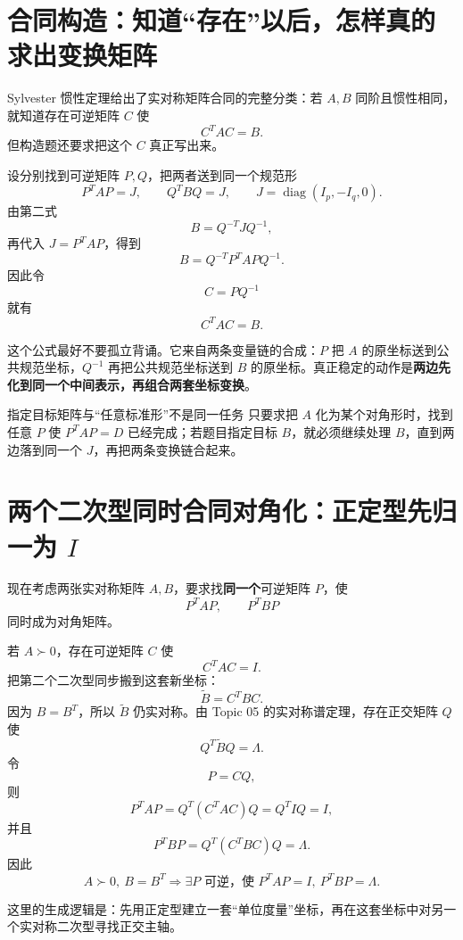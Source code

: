 \documentclass[11pt,a4paper]{ctexart}
\newcommand{\kw}[1]{\textbf{\color{deep}#1}}
\begin{document}
\section{合同构造：知道“存在”以后，怎样真的求出变换矩阵}

Sylvester 惯性定理给出了实对称矩阵合同的完整分类：若 $A,B$ 同阶且惯性相同，就知道存在可逆矩阵 $C$ 使
\[
C^TAC=B.
\]
但构造题还要求把这个 $C$ 真正写出来。

设分别找到可逆矩阵 $P,Q$，把两者送到同一个规范形
\[
P^TAP=J,
\qquad
Q^TBQ=J,
\qquad
J=\operatorname{diag}(I_p,-I_q,0).
\]
由第二式
\[
B=Q^{-T}JQ^{-1},
\]
再代入 $J=P^TAP$，得到
\[
B=Q^{-T}P^TAPQ^{-1}.
\]
因此令
\[
\boxed{C=PQ^{-1}}
\]
就有
\[
\boxed{C^TAC=B.}
\]

这个公式最好不要孤立背诵。它来自两条变量链的合成：$P$ 把 $A$ 的原坐标送到公共规范坐标，$Q^{-1}$ 再把公共规范坐标送到 $B$ 的原坐标。真正稳定的动作是\kw{两边先化到同一个中间表示，再组合两套坐标变换}。

\begin{methodbox}{指定目标矩阵与“任意标准形”不是同一任务}
只要求把 $A$ 化为某个对角形时，找到任意 $P$ 使 $P^TAP=D$ 已经完成；若题目指定目标 $B$，就必须继续处理 $B$，直到两边落到同一个 $J$，再把两条变换链合起来。
\end{methodbox}

\section{两个二次型同时合同对角化：正定型先归一为 $I$}

现在考虑两张实对称矩阵 $A,B$，要求找\kw{同一个}可逆矩阵 $P$，使
\[
P^TAP,
\qquad
P^TBP
\]
同时成为对角矩阵。

若 $A\succ0$，存在可逆矩阵 $C$ 使
\[
C^TAC=I.
\]
把第二个二次型同步搬到这套新坐标：
\[
\widetilde B=C^TBC.
\]
因为 $B=B^T$，所以 $\widetilde B$ 仍实对称。由 Topic 05 的实对称谱定理，存在正交矩阵 $Q$ 使
\[
Q^T\widetilde BQ=\Lambda.
\]
令
\[
\boxed{P=CQ},
\]
则
\[
P^TAP=Q^T(C^TAC)Q=Q^TIQ=I,
\]
并且
\[
P^TBP=Q^T(C^TBC)Q=\Lambda.
\]
因此
\[
\boxed{A\succ0,\ B=B^T
\Longrightarrow
\exists P\text{ 可逆，使 }P^TAP=I,\ P^TBP=\Lambda.}
\]

这里的生成逻辑是：先用正定型建立一套“单位度量”坐标，再在这套坐标中对另一个实对称二次型寻找正交主轴。
\end{document}
